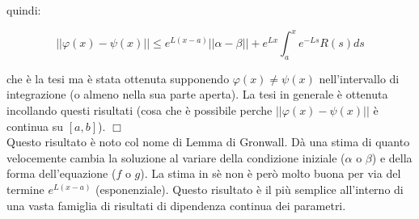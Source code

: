 \documentclass[a4paper,11pt,titlepage]{book}
\begin{document}
quindi:

$$||\varphi(x)-\psi(x)||\leq e^{L(x-a)}||\alpha-\beta||+e^{Lx}\int_a^x e^{-Ls}R(s)ds$$

che è la tesi ma è stata ottenuta supponendo $\varphi(x)\ne\psi(x)$ nell'intervallo di integrazione (o almeno nella sua parte aperta). La tesi in generale è ottenuta incollando questi risultati (cosa che è possibile perche $||\varphi(x)-\psi(x)||$ è continua su $[a,b]$). $\Box$\\

Questo risultato è noto col nome di Lemma di Gronwall. Dà una stima di quanto velocemente cambia la soluzione al variare della condizione iniziale ($\alpha$ o $\beta$) e della forma dell'equazione ($f$ o $g$). La stima in sè non è però molto buona per via del termine $e^{L(x-a)}$ (esponenziale). Questo risultato è il più semplice all'interno di una vasta famiglia di risultati di dipendenza continua dei parametri.\\
\end{document}
